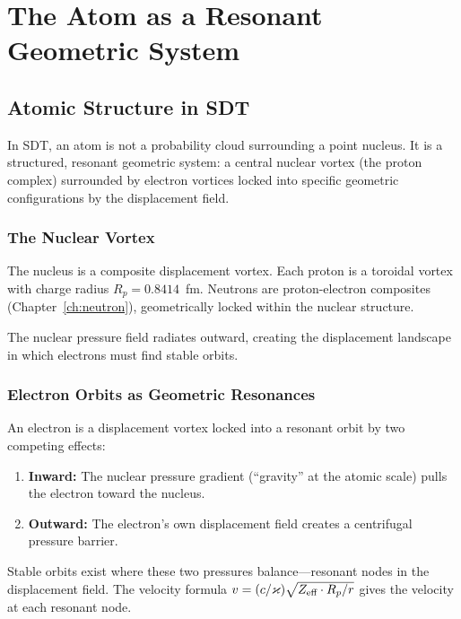\chapter{The Atom as a Resonant Geometric System}
\label{ch:atom-resonant}


\section{Atomic Structure in SDT}

In SDT, an atom is not a probability cloud surrounding a point nucleus. It is a structured, resonant geometric system: a central nuclear vortex (the proton complex) surrounded by electron vortices locked into specific geometric configurations by the displacement field.

\subsection{The Nuclear Vortex}

The nucleus is a composite displacement vortex. Each proton is a toroidal vortex with charge radius $R_p = 0.8414$~fm. Neutrons are proton-electron composites (Chapter~\ref{ch:neutron}), geometrically locked within the nuclear structure.

The nuclear pressure field radiates outward, creating the displacement landscape in which electrons must find stable orbits.

\subsection{Electron Orbits as Geometric Resonances}

An electron is a displacement vortex locked into a resonant orbit by two competing effects:
\begin{enumerate}
  \item \textbf{Inward:} The nuclear pressure gradient (``gravity'' at the atomic scale) pulls the electron toward the nucleus.
  \item \textbf{Outward:} The electron's own displacement field creates a centrifugal pressure barrier.
\end{enumerate}

Stable orbits exist where these two pressures balance---resonant nodes in the displacement field. The velocity formula $v = (c/\varkappa)\sqrt{Z_{\text{eff}} \cdot R_p / r}$ gives the velocity at each resonant node.


